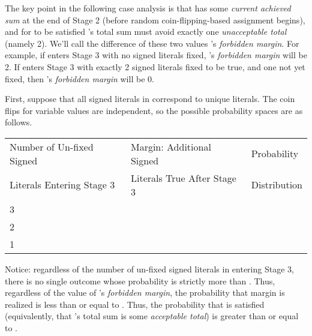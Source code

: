 \documentclass{article}
\begin{document}
The key point in the following case analysis is that  has some \textit{current achieved sum} at the end of Stage 2 (before random coin-flipping-based assignment begins), and for  to be satisfied 's total sum must avoid exactly one \textit{unacceptable total} (namely 2). We'll call the difference of these two values 's \textit{forbidden margin}. For example, if  enters Stage 3 with no signed literals fixed, 's \textit{forbidden margin} will be 2. If  enters Stage 3 with exactly 2 signed literals fixed to be true, and one not yet fixed, then 's \textit{forbidden margin} will be 0.  

First, suppose that all signed literals in  correspond to unique literals. The coin flips for variable values are independent, so the possible probability spaces are as follows.\\

\renewcommand\arraystretch{1.3} 

\begin{tabular}{|l|l|l|} \hline
Number of Un-fixed Signed  & Margin: Additional Signed  & Probability  \\
Literals Entering Stage 3 & Literals True After Stage 3& Distribution  \\
\hline
3 & & \\ 
\hline
2 & & \\ 
\hline
1 & & \\ 
\hline
\end{tabular}

\vspace{4mm}

Notice: regardless of the number of un-fixed signed literals in  entering Stage 3, there is no single outcome whose probability is strictly more than .  Thus, regardless of the value of 's \textit{forbidden margin}, the probability that margin is realized is less than or equal to . Thus, the probability that  is satisfied (equivalently, that 's total sum is some \textit{acceptable total}) is greater than or equal to . 
\end{document}
